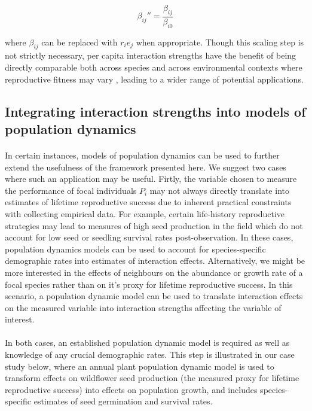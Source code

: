 \documentclass[a4,12pt]{article}
\begin{document}
        \begin{equation}
        {\beta_{ij}}'' = \frac{\beta_{ij}}{\beta_{i0}}
        \label{scaling}
        \end{equation}

        where $\beta_{ij}$ can be replaced with $r_i e_j$ when appropriate. Though this scaling step is not strictly necessary, per capita interaction strengths have the benefit of being directly comparable both across species and across environmental contexts where reproductive fitness may vary \parencite{Wootton2005}, leading to a wider range of potential applications.

    \subsection{Integrating interaction strengths into models of population dynamics}

        \paragraph{}
        In certain instances, models of population dynamics can be used to further extend the usefulness of the framework presented here. We suggest two cases where such an application may be useful. Firtly, the variable chosen to measure the performance of focal individuals $P_i$ may not always directly translate into estimates of lifetime reproductive success due to inherent practical constraints with collecting empirical data. For example, certain life-history reproductive strategies may lead to measures of high seed production in the field which do not account for low seed or seedling survival rates post-observation. In these cases, population dynamics models can be used to account for species-specific demographic rates into estimates of interaction effects. Alternatively, we might be more interested in the effects of neighbours on the abundance or growth rate of a focal species rather than on it's proxy for lifetime reproductive success. In this scenario, a population dynamic model can be used to translate interaction effects on the measured variable into interaction strengths affecting the variable of interest. 

        \paragraph{}
        In both cases, an established population dynamic model is required as well as knowledge of any crucial demographic rates. This step is illustrated in our case study below, where an annual plant population dynamic model is used to transform effects on wildflower seed production (the measured proxy for lifetime reproductive success) into effects on population growth, and includes species-specific estimates of seed germination and survival rates. 
\end{document}
